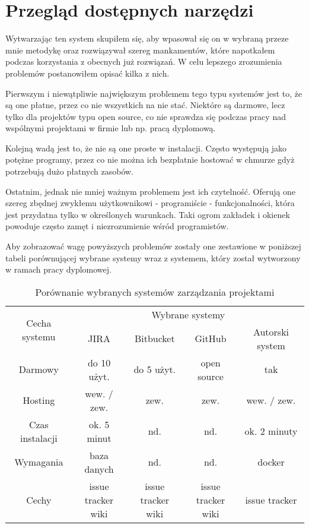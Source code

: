\section{Przegląd dostępnych narzędzi}
Wytwarzając ten system skupiłem się, aby wpasował się on w wybraną przeze mnie metodykę oraz rozwiązywał szereg mankamentów, które napotkałem podczas korzystania z obecnych już rozwiązań. W celu lepszego zrozumienia problemów postanowiłem opisać kilka z nich.

Pierwszym i niewątpliwie największym problemem tego typu systemów jest to, że są one płatne, przez co nie wszystkich na nie stać. Niektóre są darmowe, lecz tylko dla projektów typu open source, co nie sprawdza się podczas pracy nad wspólnymi projektami w firmie lub np. pracą dyplomową.

Kolejną wadą jest to, że nie są one proste w instalacji. Często występują jako potężne programy, przez co nie można ich bezpłatnie hostować w chmurze gdyż potrzebują dużo płatnych zasobów. 

Ostatnim, jednak nie mniej ważnym problemem jest ich czytelność. Oferują one szereg zbędnej zwykłemu użytkownikowi - programiście - funkcjonalności, która jest przydatna tylko w określonych warunkach. Taki ogrom zakładek i okienek powoduje często zamęt i niezrozumienie wśród programistów.

Aby zobrazować wagę powyższych problemów zostały one zestawione w poniższej tabeli porównującej wybrane systemy wraz z systemem, który został wytworzony w ramach pracy dyplomowej.
\begin{table}[h!]
	\caption{Porównanie wybranych systemów zarządzania projektami}
	\centering
	\begin{tabular}{|c|c|c|c|c|}
		\hline
		\multirow{2}{*}{Cecha systemu} & \multicolumn{4}{c|}{Wybrane systemy} \\\cline{2-5} & JIRA & Bitbucket & GitHub & Autorski system\\
		\hline
		Darmowy & do 10 użyt. & do 5 użyt. & open source & tak\\
		\hline
		Hosting & wew. / zew. & zew. & zew. & wew. / zew.\\
		\hline
		Czas instalacji & ok. 5 minut & nd. & nd. & ok. 2 minuty\\
		\hline
		Wymagania & baza danych & nd. & nd. & docker\\
		\hline
		Cechy & \specialcell{issue tracker\\ wiki} & \specialcell{issue tracker\\ wiki} & \specialcell{issue tracker\\ wiki} & issue tracker\\
		\hline
		
	\end{tabular}
	\label{tabela:porownanie_systemow}
\end{table}

